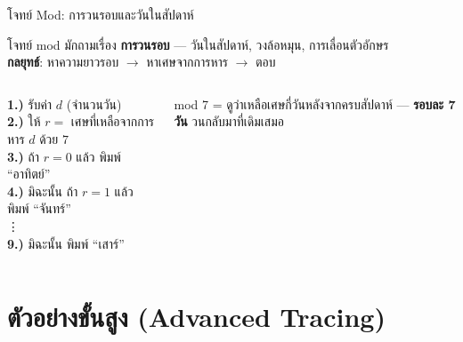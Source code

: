 \documentclass[11pt, aspectratio=169]{beamer}
\begin{document}
\begin{frame}{โจทย์ Mod: การวนรอบและวันในสัปดาห์}
  \begin{explanation}
    โจทย์ mod มักถามเรื่อง \textbf{การวนรอบ} — วันในสัปดาห์, วงล้อหมุน, การเลื่อนตัวอักษร\\
    \textbf{กลยุทธ์}: หาความยาวรอบ $\rightarrow$ หาเศษจากการหาร $\rightarrow$ ตอบ
  \end{explanation}

  \begin{columns}[T]
      \begin{pseudobox}
        \textbf{1.)} รับค่า $d$ (จำนวนวัน) \\
        \textbf{2.)} ให้ $r =$ เศษที่เหลือจากการหาร $d$ ด้วย $7$ \\
        \textbf{3.)} ถ้า $r = 0$ แล้ว พิมพ์ ``อาทิตย์'' \\
        \textbf{4.)} มิฉะนั้น ถ้า $r = 1$ แล้ว พิมพ์ ``จันทร์'' \\
        \quad\vdots \\
        \textbf{9.)} มิฉะนั้น พิมพ์ ``เสาร์''
      \end{pseudobox}

    \begin{intuition}[หลักการ]
      mod 7 = ดูว่าเหลือเศษกี่วันหลังจากครบสัปดาห์ —
      \textbf{รอบละ 7 วัน} วนกลับมาที่เดิมเสมอ
    \end{intuition}
  \end{columns}
\end{frame}

\section{ตัวอย่างขั้นสูง (Advanced Tracing)}
\end{document}
